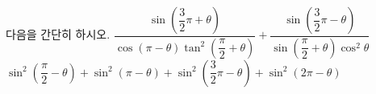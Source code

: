 다음을 간단히 하시오.
 $\dfrac{\sin\left(\dfrac{3}{2}\pi+\theta\right)}{\cos(\pi-\theta)\tan^2\left(\dfrac{\pi}{2}+\theta\right)}+\dfrac{\sin\left(\dfrac{3}{2}\pi-\theta\right)}{\sin\left(\dfrac{\pi}{2}+\theta\right)\cos^2\theta}$
 $\sin^2\left(\dfrac{\pi}{2}-\theta\right)+\sin^2(\pi-\theta)+\sin^2\left(\dfrac{3}{2}\pi-\theta\right)+\sin^2(2\pi-\theta)$
